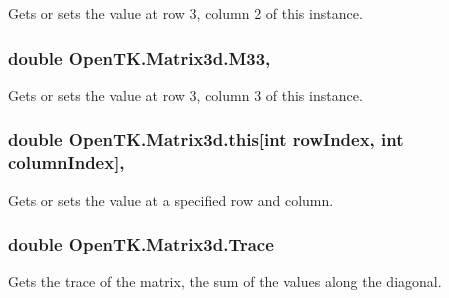 Gets or sets the value at row 3, column 2 of this instance. 

\hypertarget{struct_open_t_k_1_1_matrix3d_a0f16e84509ccfee6c6213656840e8ad3}{
\subsubsection[{M33}]{\setlength{\rightskip}{0pt plus 5cm}double Open\-T\-K.\-Matrix3d.\-M33\hspace{0.3cm}{\ttfamily [get]}, {\ttfamily [set]}}}\label{struct_open_t_k_1_1_matrix3d_a0f16e84509ccfee6c6213656840e8ad3}


Gets or sets the value at row 3, column 3 of this instance. 

\hypertarget{struct_open_t_k_1_1_matrix3d_ae651986590b6de7df506784c9f5db97b}{
\subsubsection[{this[int row\-Index, int column\-Index]}]{\setlength{\rightskip}{0pt plus 5cm}double Open\-T\-K.\-Matrix3d.\-this\mbox{[}int row\-Index, int column\-Index\mbox{]}\hspace{0.3cm}{\ttfamily [get]}, {\ttfamily [set]}}}\label{struct_open_t_k_1_1_matrix3d_ae651986590b6de7df506784c9f5db97b}


Gets or sets the value at a specified row and column. 

\hypertarget{struct_open_t_k_1_1_matrix3d_a096edfdf4c86e3fa308bdaedcf14dfc3}{
\subsubsection[{Trace}]{\setlength{\rightskip}{0pt plus 5cm}double Open\-T\-K.\-Matrix3d.\-Trace\hspace{0.3cm}{\ttfamily [get]}}}\label{struct_open_t_k_1_1_matrix3d_a096edfdf4c86e3fa308bdaedcf14dfc3}


Gets the trace of the matrix, the sum of the values along the diagonal. 

